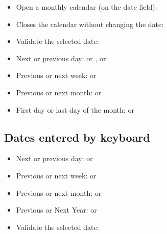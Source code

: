 \begin{itemize}
	\item Open a monthly calendar (on the date field): %
	\item Closes the calendar without changing the date: %
	\item Validate the selected date: %
	\item Next or previous day: \keys{{+}} or \keys{{-}}, \keys{\arrowkeyright} or \keys{\arrowkeyleft}%
	\item Previous or next week: \keys{\arrowkeyup} or \keys{\arrowkeydown}%
	\item Previous or next month:  or %
	\item First day or last day of the month:  or %
\end{itemize}

\subsection{Dates entered by keyboard}%

\begin{itemize}
	\item Next or previous day: \keys{{+}} or \keys{{-}}%
	\item Previous or next week:  or %
	\item Previous or next month:  or %
	\item Previous or Next Year:  or %
	\item Validate the selected date: %
\end{itemize}

